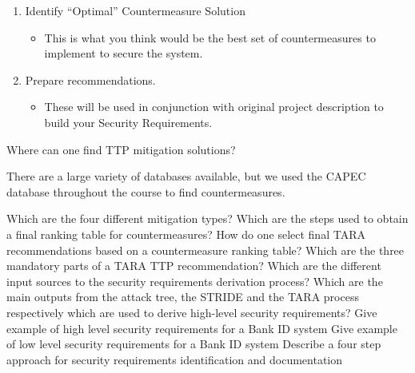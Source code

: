 \begin{questions}
\begin{solution}
\begin{enumerate}[noitemsep]
\begin{itemize}[noitemsep]
      \end{itemize}
    \item Identify ``Optimal'' Countermeasure Solution
      \begin{itemize}[noitemsep]
      \item This is what you think would be the best set of countermeasures to implement to secure the system.
      \end{itemize}
    \item Prepare recommendations.
      \begin{itemize}[noitemsep]
      \item These will be used in conjunction with original project description to build your Security Requirements.
      \end{itemize}
    \end{enumerate}
  \end{solution}

\question{} Where can one find TTP mitigation solutions?
  \begin{solution}
    There are a large variety of databases available, but we used the CAPEC database throughout the course to find countermeasures.
  \end{solution}

\question{} Which are the four different mitigation types?
\question{} Which are the steps used to obtain a final ranking table for countermeasures?
\question{} How do one select final TARA recommendations based on a countermeasure ranking table?
\question{} Which are the three mandatory parts of a TARA TTP recommendation?
\question{} Which are the different input sources to the security requirements derivation process?
\question{} Which are the main outputs from the attack tree, the STRIDE and the TARA process respectively which are used to derive high-level security requirements?
\question{} Give example of high level security requirements for a Bank ID system
\question{} Give example of low level security requirements  for a Bank ID system
\question{} Describe a four step approach for security requirements identification and documentation
\end{questions}

